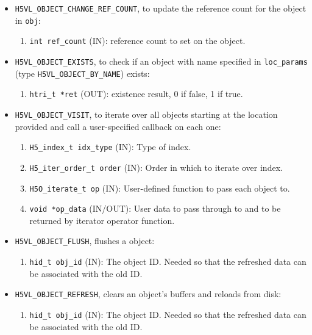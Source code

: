 \begin{itemize}
\item \texttt{H5VL\_OBJECT\_CHANGE\_REF\_COUNT}, to update the reference
  count for the object in \texttt{obj}:
  \begin{enumerate}
  \item \texttt{int ref\_count} (IN): reference count to set on the object.
  \end{enumerate}

\item \texttt{H5VL\_OBJECT\_EXISTS}, to check if an object with name
  specified in \texttt{loc\_params} (type \texttt{H5VL\_OBJECT\_BY\_NAME})
  exists:
  \begin{enumerate}
  \item \texttt{htri\_t *ret} (OUT): existence result, 0 if false, 1 if true.
  \end{enumerate}

\item \texttt{H5VL\_OBJECT\_VISIT}, to iterate over all objects starting at the location provided and call a user-specified callback on each one:
  \begin{enumerate}
  \item \texttt{H5\_index\_t idx\_type} (IN): Type of index.\\
  \item \texttt{H5\_iter\_order\_t order} (IN): Order in which to iterate over index.\\
  \item \texttt{H5O\_iterate\_t op} (IN): User-defined function to pass each object to. \\
  \item \texttt{void *op\_data} (IN/OUT): User data to pass through to and to be returned by iterator operator function. \\
  \end{enumerate}
  
\item \texttt{H5VL\_OBJECT\_FLUSH}, flushes a object:
  \begin{enumerate}
  \item \texttt{hid\_t obj\_id} (IN): The object ID. Needed so that the refreshed data can be associated with the old ID. 
  \end{enumerate}

\item \texttt{H5VL\_OBJECT\_REFRESH}, clears an object's buffers and reloads from disk:
  \begin{enumerate}
  \item \texttt{hid\_t obj\_id} (IN): The object ID. Needed so that the refreshed data can be associated with the old ID. 
  \end{enumerate}
\end{itemize}


